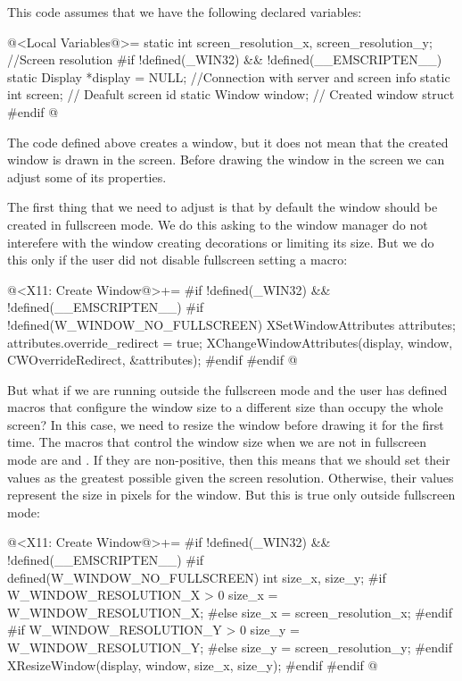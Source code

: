 This code assumes that we have the following declared variables:

\iniciocodigo
@<Local Variables@>=
static int screen_resolution_x, screen_resolution_y; //Screen resolution
#if !defined(_WIN32) && !defined(__EMSCRIPTEN__)
static Display *display = NULL; //Connection with server and screen info
static int screen;       // Deafult screen id
static Window window;    // Created window struct
#endif
@
\fimcodigo

The code defined above creates a window, but it does not mean that the
created window is drawn in the screen. Before drawing the window in
the screen we can adjust some of its properties.

The first thing that we need to adjust is that by default the window
should be created in fullscreen mode. We do this asking to the window
manager do not interefere with the window creating decorations or
limiting its size. But we do this only if the user did not disable
fullscreen setting a macro:

\iniciocodigo
@<X11: Create Window@>+=
#if !defined(_WIN32) && !defined(__EMSCRIPTEN__)
#if !defined(W_WINDOW_NO_FULLSCREEN)
{
  XSetWindowAttributes attributes;
  attributes.override_redirect = true;
  XChangeWindowAttributes(display, window, CWOverrideRedirect,
                          &attributes);
}
#endif
#endif
@
\fimcodigo

But what if we are running outside the fullscreen mode and the user
has defined macros that configure the window size to a different size
than occupy the whole screen? In this case, we need to resize the
window before drawing it for the first time. The macros that control
the window size when we are not in fullscreen mode
are 
and . If they are non-positive,
then this means that we should set their values as the greatest
possible given the screen resolution. Otherwise, their values
represent the size in pixels for the window. But this is true only
outside fullscreen mode:

\iniciocodigo
@<X11: Create Window@>+=
#if !defined(_WIN32) && !defined(__EMSCRIPTEN__)
#if defined(W_WINDOW_NO_FULLSCREEN)
{
  int size_x, size_y;
#if W_WINDOW_RESOLUTION_X > 0
  size_x = W_WINDOW_RESOLUTION_X;
#else
  size_x = screen_resolution_x;
#endif
#if W_WINDOW_RESOLUTION_Y > 0
  size_y = W_WINDOW_RESOLUTION_Y;
#else
  size_y = screen_resolution_y;
#endif
  XResizeWindow(display, window, size_x, size_y);
}
#endif
#endif
@
\fimcodigo

